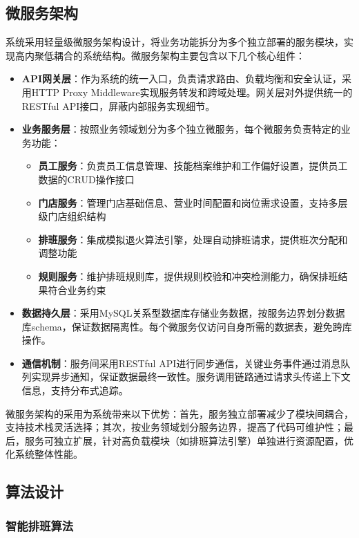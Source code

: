\documentclass{ctexart}
\begin{document}
\subsection{微服务架构}
系统采用轻量级微服务架构设计，将业务功能拆分为多个独立部署的服务模块，实现高内聚低耦合的系统结构。微服务架构主要包含以下几个核心组件：

\begin{itemize}
    \item \textbf{API网关层}：作为系统的统一入口，负责请求路由、负载均衡和安全认证，采用HTTP Proxy Middleware实现服务转发和跨域处理。网关层对外提供统一的RESTful API接口，屏蔽内部服务实现细节。
    
    \item \textbf{业务服务层}：按照业务领域划分为多个独立微服务，每个微服务负责特定的业务功能：
    \begin{itemize}
        \item \textbf{员工服务}：负责员工信息管理、技能档案维护和工作偏好设置，提供员工数据的CRUD操作接口
        \item \textbf{门店服务}：管理门店基础信息、营业时间配置和岗位需求设置，支持多层级门店组织结构
        \item \textbf{排班服务}：集成模拟退火算法引擎，处理自动排班请求，提供班次分配和调整功能
        \item \textbf{规则服务}：维护排班规则库，提供规则校验和冲突检测能力，确保排班结果符合业务约束
    \end{itemize}
    
    \item \textbf{数据持久层}：采用MySQL关系型数据库存储业务数据，按服务边界划分数据库schema，保证数据隔离性。每个微服务仅访问自身所需的数据表，避免跨库操作。
    
    \item \textbf{通信机制}：服务间采用RESTful API进行同步通信，关键业务事件通过消息队列实现异步通知，保证数据最终一致性。服务调用链路通过请求头传递上下文信息，支持分布式追踪。
\end{itemize}

微服务架构的采用为系统带来以下优势：首先，服务独立部署减少了模块间耦合，支持技术栈灵活选择；其次，按业务领域划分服务边界，提高了代码可维护性；最后，服务可独立扩展，针对高负载模块（如排班算法引擎）单独进行资源配置，优化系统整体性能。

\subsection{算法设计}
\subsubsection{智能排班算法}
\end{document}
